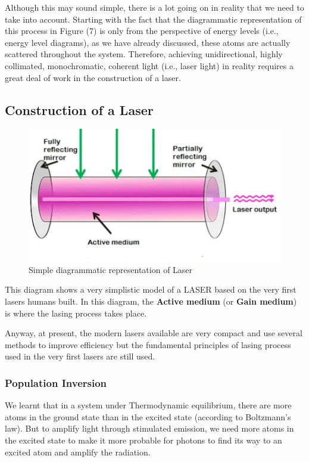\documentclass[12pt]{article}
\begin{document}
Although this may sound simple, there is a lot going on in reality that we need to take into account. Starting with the fact that the diagrammatic representation of this process in Figure (7) is only from the perspective of energy levels (i.e., energy level diagrams), as we have already discussed, these atoms are actually scattered throughout the system. Therefore, achieving unidirectional, highly collimated, monochromatic, coherent light (i.e., laser light) in reality requires a great deal of work in the construction of a laser.

\subsection{Construction of a Laser}


\begin{figure}[H]
    \centering
    \includegraphics[scale=.9]{./img/09_active_medium.png}
    \caption{Simple diagrammatic representation of Laser}
\end{figure}

This diagram shows a very simplistic model of a LASER based on the very first lasers humans built. In this diagram, the \textbf{Active medium} (or \textbf{Gain medium}) is where the lasing process takes place. \vspace{.2cm}

Anyway, at present, the modern lasers available are very compact and use several methods to improve efficiency but the fundamental principles of lasing process used in the very first lasers are still used.

\subsubsection{Population Inversion}

We learnt that in a system under Thermodynamic equilibrium, there are more atoms in the ground state than in the excited state (according to Boltzmann's law). But to amplify light through stimulated emission, we need more atoms in the excited state to make it more probable for photons to find its way to an excited atom and amplify the radiation. \vspace{.2cm}
\end{document}
